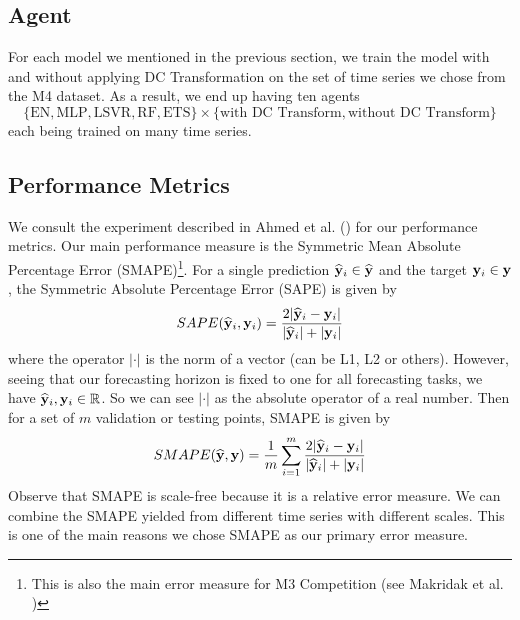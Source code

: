 \subsection{Agent}
For each model we mentioned in the previous section, we train the model with and without applying DC Transformation on the set of time series we chose from the M4 dataset. As a result, we end up having ten agents
\begin{equation*}
    \{\text{EN}, \text{MLP}, \text{LSVR}, \text{RF}, \text{ETS} \} \times \{ \text{with DC Transform}, \text{without DC Transform} \}
\end{equation*}
each being trained on many time series.

\subsection{Performance Metrics}\label{subsec: performance metrics}
We consult the experiment described in Ahmed et al. (\citeyear{2010EmpiricalMLComparison}) for our performance metrics. Our main performance measure is the Symmetric Mean Absolute Percentage Error (SMAPE)\footnote{This is also the main error measure for M3 Competition (see Makridak et al. \citeyear{makridakis2000m3})}. For a single prediction $\widehat{\mathbf{y}}_i \in \widehat{\mathbf{y}}$ and the target $\mathbf{y}_i \in \mathbf{y}$, the Symmetric Absolute Percentage Error (SAPE) is given by
\begin{equation*}
    SAPE(\widehat{\mathbf{y}}_i, \mathbf{y}_i) = \frac{2| \widehat{\mathbf{y}}_i - \mathbf{y}_i|}{|\widehat{\mathbf{y}}_i| + |\mathbf{y}_i| }
\end{equation*}
where the operator $| \cdot |$ is the norm of a vector (can be L1, L2 or others). However, seeing that our forecasting horizon is fixed to one for all forecasting tasks, we have $\widehat{\mathbf{y}}_i, \mathbf{y}_i \in \mathbb{R}$. So we can see $| \cdot |$ as the absolute operator of a real number. Then for a set of $m$ validation or testing points, SMAPE is given by
\begin{equation*}
    SMAPE(\widehat{\mathbf{y}}, \mathbf{y}) = \frac{1}{m} \sum_{i=1}^{m} \frac{2| \widehat{\mathbf{y}}_i - \mathbf{y}_i|}{|\widehat{\mathbf{y}}_i| + |\mathbf{y}_i| }
\end{equation*}
Observe that SMAPE is scale-free because it is a relative error measure. We can combine the SMAPE yielded from different time series with different scales. This is one of the main reasons we chose SMAPE as our primary error measure.

